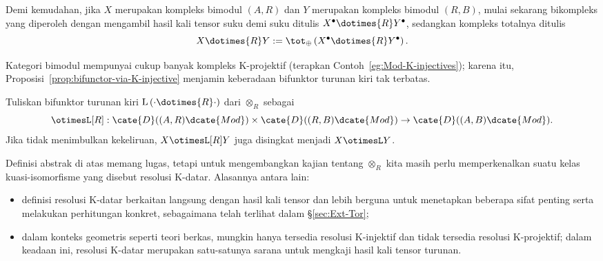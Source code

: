 Demi kemudahan, jika $X$ merupakan kompleks bimodul $(A,R)$ dan $Y$ merupakan
kompleks bimodul $(R,B)$, mulai sekarang bikompleks yang diperoleh dengan
mengambil hasil kali tensor suku demi suku ditulis
$X^\bullet\dotimes{R}Y^\bullet$, sedangkan kompleks totalnya ditulis
\[ X \dotimes{R} Y := \tot_{\oplus} \left( X^\bullet \dotimes{R} Y^\bullet \right). \]

Kategori bimodul mempunyai cukup banyak kompleks K-projektif (terapkan
Contoh~\ref{eg:Mod-K-injectives}); karena itu,
Proposisi~\ref{prop:bifunctor-via-K-injective} menjamin keberadaan bifunktor
turunan kiri tak terbatas.

\begin{definisi}\label{def:otimesL}
	Tuliskan bifunktor turunan kiri
	$\mathrm{L}\left(\cdot\dotimes{R}\cdot\right)$ dari $\otimes_R$ sebagai
	\[ \otimesL[R] : \cate{D}((A, R)\dcate{Mod}) \times \cate{D}((R, B)\dcate{Mod}) \to \cate{D}((A, B)\dcate{Mod}). \]
	Jika tidak menimbulkan kekeliruan, $X\otimesL[R]Y$ juga disingkat menjadi
	$X\otimesL Y$.
\end{definisi}

Definisi abstrak di atas memang lugas, tetapi untuk mengembangkan kajian
tentang $\otimes_R$ kita masih perlu memperkenalkan suatu kelas
kuasi-isomorfisme yang disebut resolusi K-datar. Alasannya antara lain:
\begin{itemize}
	\item definisi resolusi K-datar berkaitan langsung dengan hasil kali tensor
	dan lebih berguna untuk menetapkan beberapa sifat penting serta melakukan
	perhitungan konkret, sebagaimana telah terlihat dalam \S\ref{sec:Ext-Tor};
	\item dalam konteks geometris seperti teori berkas, mungkin hanya tersedia
	resolusi K-injektif dan tidak tersedia resolusi K-projektif; dalam keadaan
	ini, resolusi K-datar merupakan satu-satunya sarana untuk mengkaji hasil kali
	tensor turunan.
\end{itemize}

